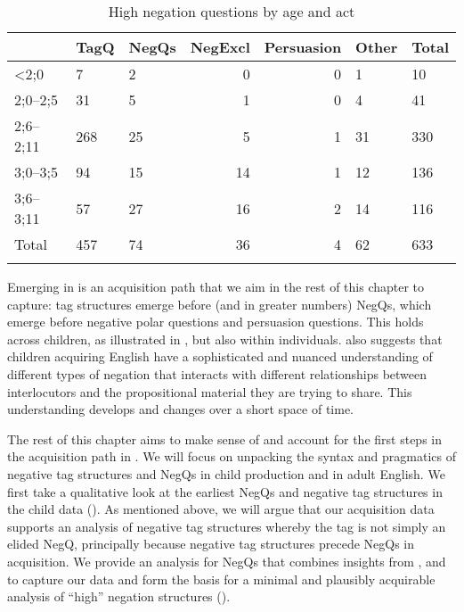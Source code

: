 \documentclass[output=paper,colorlinks,citecolor=brown]{langscibook}
\begin{document}
\begin{table}
  \begin{tabularx}{\textwidth}{lYYrrYY}
  \lsptoprule
            & TagQ & NegQs  & NegExcl & Persuasion & Other & Total \\
  \midrule
  <2;0  &   7  &    2  &    0      & 0 & 1 & 10 \\
  2;0--2;5  &   31  &    5  &   1      & 0 & 4 & 41 \\
  2;6--2;11  &   268  &  25  &    5      & 1 & 31 & 330 \\
  3;0--3;5  &  94  &   15  &    14     & 1 & 12 & 136 \\
  3;6--3;11  &  57  &    27  &   16      & 2 & 14 & 116 \\
  \midrule
  Total &   457  &    74  &    36     & 4 & 62 & 633 \\
  \lspbottomrule
 \end{tabularx}
 \caption{High negation questions by age and act}
\label{tab:highneg:ageact}
\end{table}

Emerging in  is an acquisition path that we aim in the rest of this chapter to capture: tag structures emerge before (and in greater numbers) NegQs, which emerge before negative polar questions and persuasion questions. This holds across children, as illustrated in , but also within individuals.  also suggests that children acquiring English have a sophisticated and nuanced understanding of different types of negation that interacts with different relationships between interlocutors and the propositional material they are trying to share. This understanding develops and changes over a short space of time.

The rest of this chapter aims to make sense of and account for the first steps in the acquisition path in . We will focus on unpacking the syntax and pragmatics of negative tag structures and NegQs in child production and in adult English. We first take a qualitative look at the earliest NegQs and negative tag structures in the child data (). As mentioned above, we will argue that our acquisition data supports an analysis of negative tag structures whereby the tag is not simply an elided NegQ, principally because negative tag structures precede NegQs in acquisition. We provide an analysis for NegQs that combines insights from \citet{krifka2015SALT}, \citet{goodhue2022allc} and \citet{holmberg2016} to capture our data and form the basis for a minimal and plausibly acquirable analysis of ``high'' negation structures (). %
\end{document}
